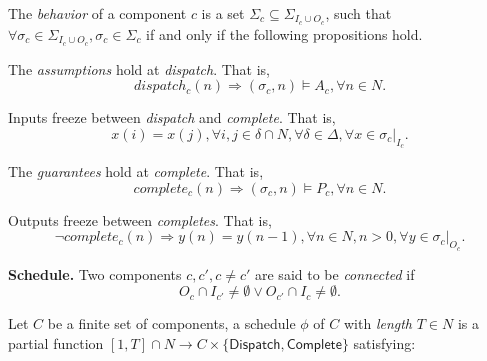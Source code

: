 
The \emph{behavior} of a component $c$ is a set $\Sigma_c \subseteq \Sigma_{I_c \cup O_c}$, such that $\forall \sigma_c \in \Sigma_{I_c \cup O_c}, \sigma_c \in \Sigma_c $ if and only if the following propositions hold.

The \emph{assumptions} hold at \emph{dispatch}. That is,
\begin{equation} 
\label{eqn:assumption}
	dispatch_c(n) \Rightarrow (\sigma_c, n) \models A_c, \forall n\in N.
\end{equation}

Inputs freeze between \emph{dispatch} and \emph{complete}. That is,
\begin{equation} 
\label{eqn:inputfreeze}
	x(i) = x(j), \forall i,j\in \delta \cap N, \forall \delta \in \Delta, \forall x \in \sigma_c|_{I_c}.
\end{equation}

The \emph{guarantees} hold at \emph{complete}. That is,
\begin{equation} 
\label{eqn:guarantee}
	complete_c(n) \Rightarrow (\sigma_c, n) \models P_c, \forall n\in N.
\end{equation}

Outputs freeze between \emph{completes}. That is,
\begin{equation} 
\label{eqn:outputfreeze}
	\lnot complete_c(n) \Rightarrow y(n) = y(n-1), \forall n \in N, n > 0, \forall y \in \sigma_c|_{O_c}.
\end{equation}

{\bf Schedule.}
Two components $ c, c', c\neq c'$ are said to be \emph{connected} if
\begin{equation*}
	O_c \cap I_{c'} \neq \emptyset \vee O_{c'} \cap I_c \neq \emptyset.
\end{equation*}

Let $C$ be a finite set of components, a schedule $\phi$ of $C$ with \emph{length} $T\in N$ is a partial function $[1, T]  \cap N\rightarrow C\times \{\textsf{Dispatch}, \textsf{Complete}\}$ satisfying:

